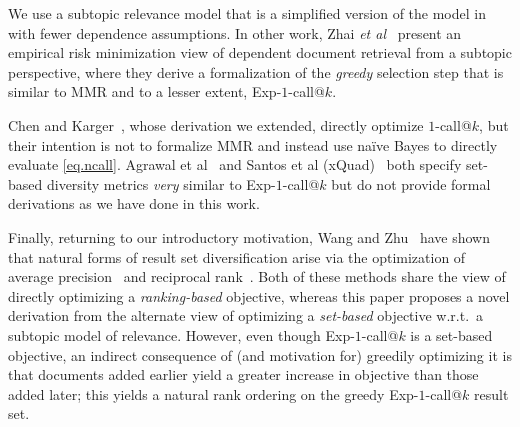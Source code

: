  We use a subtopic relevance
model that is a simplified version of the model in~\cite{plmmr} with
fewer dependence assumptions.  In other work, Zhai {\it et
al}~\cite{zhai03Beyond} present an empirical risk minimization view of
dependent document retrieval from a subtopic perspective,
where they derive a formalization of the
\emph{greedy} selection step that is similar to MMR and to a lesser
extent, Exp-$1$-call@$k$.

 Chen and
Karger~\cite{chen06Less}, whose derivation we extended, directly
optimize $1$-call@$k$, but their intention is not to formalize MMR and
instead use na\"{i}ve Bayes to directly evaluate
\eqref{eq.ncall}.  Agrawal et al~\cite{agrawal09diversifying}
and Santos et al (xQuad)~\cite{santos2010xquad} both specify set-based
diversity metrics \emph{very} similar to Exp-$1$-call@$k$ but do not provide
formal derivations as we have done in this work.

 Finally, returning to our
introductory motivation, Wang and Zhu~\cite{wangzhu10} have shown that
natural forms of result set diversification arise via the optimization
of average precision~\cite{ap} and reciprocal rank~\cite{mrr}.  Both
of these methods share the view of directly optimizing a
\emph{ranking-based} objective, whereas this paper proposes a novel
derivation from the alternate view of optimizing a \emph{set-based}
objective w.r.t.\ a subtopic model of relevance.  However, even though
Exp-$1$-call@$k$ is a set-based objective, an indirect consequence of
(and motivation for) greedily optimizing it is that documents added
earlier yield a greater increase in objective than those added later;
this yields a natural rank ordering on the greedy Exp-$1$-call@$k$
result set.

